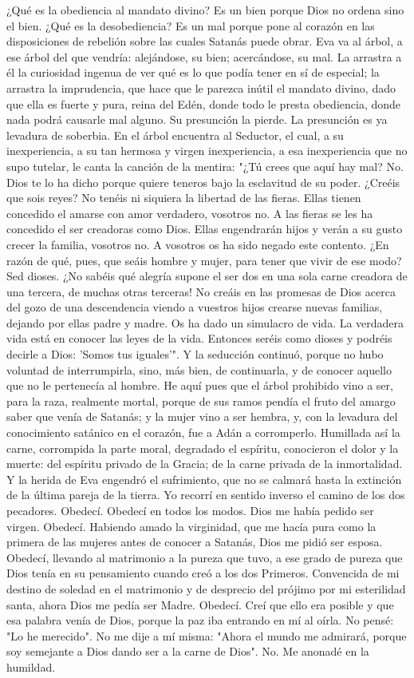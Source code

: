 \documentclass[12pt]{book} %
\begin{document}
¿Qué es la obediencia al mandato divino? Es un bien porque Dios no ordena sino el bien. ¿Qué es la desobediencia? Es 
un mal porque pone al corazón en las disposiciones de rebelión sobre las cuales Satanás puede obrar. 
Eva va al árbol, a ese árbol del que vendría: alejándose, su bien; acercándose, su mal. La arrastra a él la curiosidad 
ingenua de ver qué es lo que podía tener en sí de especial; la arrastra la imprudencia, que hace que le parezca inútil el mandato divino, dado que ella es fuerte y pura, reina del Edén, donde todo le presta obediencia, donde nada podrá causarle mal alguno. Su presunción la pierde. La presunción es ya levadura de soberbia. 
En el árbol encuentra al Seductor, el cual, a su inexperiencia, a su tan hermosa y virgen inexperiencia, a esa 
inexperiencia que no supo tutelar, le canta la canción de la mentira: "¿Tú crees que aquí hay mal? No. Dios te lo ha dicho porque quiere teneros bajo la esclavitud de su poder. ¿Creéis que sois reyes? No tenéis ni siquiera la libertad de las fieras. Ellas tienen concedido el amarse con amor verdadero, vosotros no. A las fieras se les ha concedido el ser creadoras como Dios. Ellas engendrarán hijos y verán a su gusto crecer la familia, vosotros no. A vosotros os ha sido negado este contento. ¿En razón de qué, pues, que seáis hombre y mujer, para tener que vivir de ese modo? Sed dioses. ¿No sabéis qué alegría supone el ser dos en una sola carne creadora de una tercera, de muchas otras terceras! No creáis en las promesas de Dios acerca del gozo de una descendencia viendo a vuestros hijos crearse nuevas familias, dejando por ellas padre y madre. Os ha dado un simulacro de vida. La verdadera vida está en conocer las leyes de la vida. Entonces seréis como dioses y podréis decirle a Dios: 'Somos tus iguales'". 
Y la seducción continuó, porque no hubo voluntad de interrumpirla, sino, más bien, de continuarla, y de conocer 
aquello que no le pertenecía al hombre. He aquí pues que el árbol prohibido vino a ser, para la raza, realmente mortal, porque de sus ramos pendía el fruto del amargo saber que venía de Satanás; y la mujer vino a ser hembra, y, con la levadura del conocimiento satánico en el corazón, fue a Adán a corromperlo. Humillada así la carne, corrompida la parte moral, degradado el espíritu, conocieron el dolor y la muerte: del espíritu privado de la Gracia; de la carne privada de la inmortalidad. Y la herida de Eva engendró el sufrimiento, que no se calmará hasta la extinción de la última pareja de la tierra. 
Yo recorrí en sentido inverso el camino de los dos pecadores. Obedecí. Obedecí en todos los modos. Dios me había pedido ser virgen. Obedecí. Habiendo amado la virginidad, que me hacía pura como la primera de las mujeres antes de conocer a Satanás, Dios me pidió ser esposa. Obedecí, llevando al matrimonio a la pureza que tuvo, a ese grado de pureza que Dios tenía en su pensamiento cuando creó a los dos Primeros. Convencida de mi destino de soledad en el matrimonio y de desprecio del prójimo por mi esterilidad santa, ahora Dios me pedía ser Madre. Obedecí. Creí que ello era posible y que esa palabra venía de Dios, porque la paz iba entrando en mí al oírla. No pensé: "Lo he merecido". No me dije a mí misma: "Ahora el mundo me admirará, porque soy semejante a Dios dando ser a la carne de Dios". No. Me anonadé en la humildad. 
\end{document}
